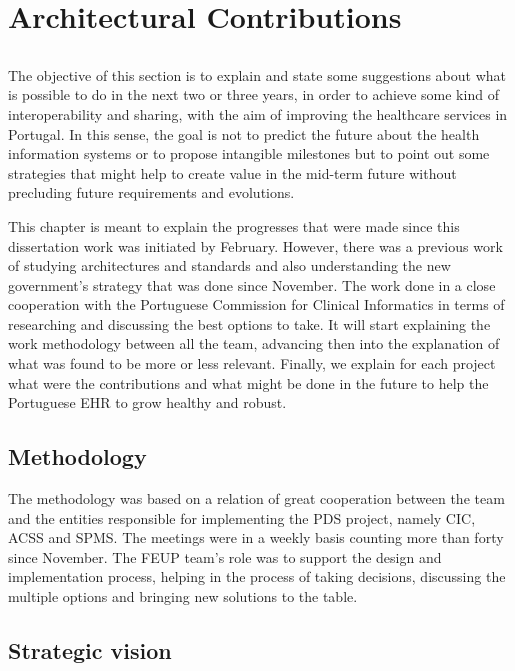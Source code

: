 \chapter{Architectural Contributions} \label{chap:arch-proposal}

\section*{}

The objective of this section is to explain and state some suggestions about what is possible to do in the next two or three years, in order to achieve some kind of interoperability and sharing, with the aim of improving the healthcare services in Portugal. In this sense, the goal is not to predict the future about the health information systems or to propose intangible milestones but to point out some strategies that might help to create value in the mid-term future without precluding future requirements and evolutions.

This chapter is meant to explain the progresses that were made since this dissertation work was initiated by February. However, there was a previous work of studying architectures and standards and also understanding the new government's strategy that was done since November. The work done in a close cooperation with the Portuguese Commission for Clinical Informatics in terms of researching and discussing the best options to take. It will start explaining the work methodology between all the team, advancing then into the explanation of what was found to be more or less relevant. Finally, we explain for each project what were the contributions and what might be done in the future to help the Portuguese EHR to grow healthy and robust.

\section{Methodology}

The methodology was based on a relation of great cooperation between the team and the entities responsible for implementing the PDS project, namely CIC, ACSS and SPMS. The meetings were in a weekly basis counting more than forty since November. The FEUP team's role was to support the design and implementation process, helping in the process of taking decisions, discussing the multiple options and bringing new solutions to the table.

\section{Strategic vision}

